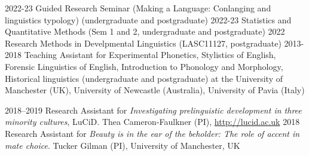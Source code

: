 \documentclass[9pt]{developercv} %
\begin{document}


\begin{entrylist}
	\entry
		{2022-23}
		{Guided Research Seminar (Making a Language: Conlanging and linguistics typology) \textnormal{(undergraduate and postgraduate)}}
		{}
		{}
	\entry
		{2022-23}
		{Statistics and Quantitative Methods \textnormal{(Sem 1 and 2, undergraduate and postgraduate)}}
		{}
		{}
	\entry
		{2022}
		{Research Methods in Develpmental Linguistics \textnormal{(LASC11127, postgraduate)}}
		{}
		{}
	\entry
	  {2013-2018}
	  {\textnormal{Teaching Assistant for} Experimental Phonetics, Stylistics of English, Forensic Linguistics of English, Introduction to Phonology and Morphology, Historical linguistics \textnormal{(undergraduate and postgraduate) at the University of Manchester (UK), University of Newcastle (Australia), University of Pavia (Italy)}}
	  {}
	  {}
\end{entrylist}


\begin{entrylist}
\end{entrylist}



\begin{entrylist}
	\entry
		{2018--2019}
		{\textnormal{Research Assistant for \textit{Investigating prelinguistic development in three minority cultures}, LuCiD.}}
		{}
		{Thea Cameron-Faulkner (PI), \url{http://lucid.ac.uk}}
	\entry
		{2018}
		{\textnormal{Research Assistant for \textit{Beauty is in the ear of the beholder: The role of accent in mate choice}.}}
		{}
		{Tucker Gilman (PI), University of Manchester, UK}
\end{entrylist}
\end{document}
